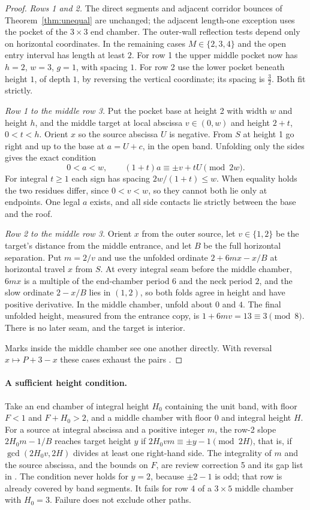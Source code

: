 \documentclass[11pt]{article}
\theoremstyle{definition}
\theoremstyle{remark}
\begin{document}
\begin{proof}
\emph{Rows 1 and 2.} The direct segments and adjacent corridor bounces of
Theorem~\ref{thm:unequal} are unchanged; the adjacent length-one exception uses
the pocket of the $3\times 3$ end chamber. The outer-wall reflection tests depend
only on horizontal coordinates. In the remaining cases $M\in\{2,3,4\}$ and the
open entry interval has length at least $2$. For row 1 the upper middle pocket
now has $h=2$, $w=3$, $g=1$, with spacing $1$. For row 2 use the lower pocket
beneath height $1$, of depth $1$, by reversing the vertical coordinate; its
spacing is $\tfrac32$. Both fit strictly.

\emph{Row 1 to the middle row 3.} Put the pocket base at height 2 with width $w$
and height $h$, and the middle target at local abscissa $v\in(0,w)$ and height
$2+t$, $0<t<h$. Orient $x$ so the source abscissa $U$ is negative. From $S$ at
height 1 go right and up to the base at $a=U+c$, in the open band. Unfolding only
the sides gives the exact condition
\[
0<a<w,\qquad (1+t)a\equiv \pm v+tU\pmod{2w}.
\]
For integral $t\ge 1$ each sign has spacing $2w/(1+t)\le w$. When equality holds
the two residues differ, since $0<v<w$, so they cannot both lie only at
endpoints. One legal $a$ exists, and all side contacts lie strictly between the
base and the roof.

\emph{Row 2 to the middle row 3.} Orient $x$ from the outer source, let
$v\in\{1,2\}$ be the target's distance from the middle entrance, and let $B$ be
the full horizontal separation. Put $m=2/v$ and use the unfolded ordinate
$2+6mx-x/B$ at horizontal travel $x$ from $S$. At every integral seam before the
middle chamber, $6mx$ is a multiple of the end-chamber period $6$ and the neck
period $2$, and the slow ordinate $2-x/B$ lies in $(1,2)$, so both folds agree in
height and have positive derivative. In the middle chamber, unfold about $0$ and
$4$. The final unfolded height, measured from the entrance copy, is
$1+6mv=13\equiv 3\pmod 8$. There is no later seam, and the target is interior.

Marks inside the middle chamber see one another directly. With reversal
$x\mapsto P+3-x$ these cases exhaust the pairs \cite{R4,d202}.
\end{proof}

\paragraph{A sufficient height condition.} Take an end chamber of integral
height $H_0$ containing the unit band, with floor $F<1$ and $F+H_0>2$, and a middle
chamber with floor $0$ and integral height $H$. For a source at integral abscissa
and a positive integer $m$, the row-2 slope $2H_0m-1/B$ reaches target height $y$
if $2H_0vm\equiv\pm y-1\pmod{2H}$, that is, if $\gcd(2H_0v,2H)$ divides at least
one right-hand side. The integrality of $m$ and the source abscissa, and the
bounds on $F$, are review correction 5 and its gap list in \cite{d202}. The
condition never holds for $y=2$, because $\pm 2-1$ is odd; that row is already
covered by band segments. It fails for row 4 of a $3\times 5$ middle chamber
with $H_0=3$. Failure does not exclude other paths.
\end{document}

